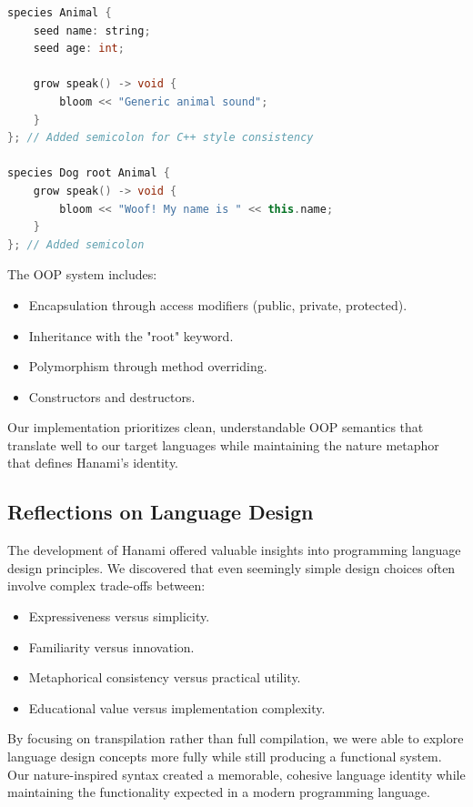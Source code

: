 \documentclass[conference]{IEEEtran}
\begin{document}
\begin{lstlisting}[language=C++, caption={Hanami OOP example with inheritance}, label={lst:oop_example}]
species Animal {
    seed name: string;
    seed age: int;

    grow speak() -> void {
        bloom << "Generic animal sound";
    }
}; // Added semicolon for C++ style consistency

species Dog root Animal {
    grow speak() -> void {
        bloom << "Woof! My name is " << this.name;
    }
}; // Added semicolon
\end{lstlisting}
The OOP system includes:
\begin{itemize}
    \item Encapsulation through access modifiers (public, private, protected).
    \item Inheritance with the "root" keyword.
    \item Polymorphism through method overriding.
    \item Constructors and destructors.
\end{itemize}
Our implementation prioritizes clean, understandable OOP semantics that translate well to our target languages while maintaining the nature metaphor that defines Hanami's identity.

\subsection{Reflections on Language Design}
The development of Hanami offered valuable insights into programming language design principles. We discovered that even seemingly simple design choices often involve complex trade-offs between:
\begin{itemize}
    \item Expressiveness versus simplicity.
    \item Familiarity versus innovation.
    \item Metaphorical consistency versus practical utility.
    \item Educational value versus implementation complexity.
\end{itemize}
By focusing on transpilation rather than full compilation, we were able to explore language design concepts more fully while still producing a functional system. Our nature-inspired syntax created a memorable, cohesive language identity while maintaining the functionality expected in a modern programming language.
\end{document}
